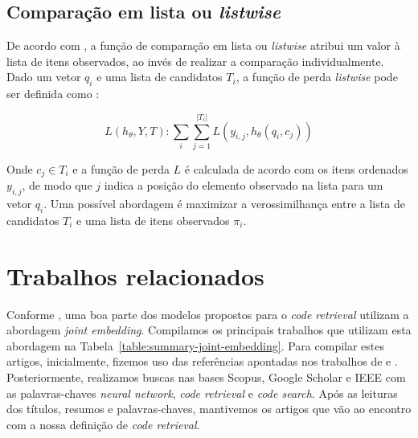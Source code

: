 \subsection{Comparação em lista ou \textit{listwise}}

De acordo com \cite{wu-sql-rank-listwise-approach:2018}, a função de comparação em lista ou \textit{listwise} atribui um valor à lista de itens observados, ao invés de realizar a comparação individualmente. Dado um vetor $q_{i}$ e uma lista de candidatos $T_{i}$, a função de perda \textit{listwise} pode ser definida como \citep{guo-deep-look-into-neural-ranking-models:2019}:

\begin{equation}
    L (h_{\theta}, Y, T): \sum_{i} \sum_{j = 1}^{|T_{i}|} L( y_{i,j}, h_{\theta}(q_{i}, c_{j}))
\end{equation}

Onde $c_{j} \in T_{i}$ e a função de perda $L$ é calculada de acordo com os itens ordenados $y_{i,j}$, de modo que $j$ indica a posição do elemento observado na lista para um vetor $q_{i}$. Uma possível abordagem é maximizar a verossimilhança entre a lista de candidatos $T_{i}$ e uma lista de itens observados $\pi_{i}$.



    

\section{Trabalhos relacionados}\label{sec:code-retrieval-trabalhos-relacionados}

Conforme \cite{cambronero-deep-learning-code-search:2019}, uma boa parte dos modelos propostos para o \textit{code retrieval} utilizam a abordagem \textit{joint embedding}. Compilamos os principais trabalhos que utilizam esta abordagem na Tabela~\ref{table:summary-joint-embedding}. Para compilar estes artigos, inicialmente, fizemos uso das referências apontadas nos  trabalhos de \citeauthor{Allamanis:2018:SML} e \citeauthor{yao-2018}. Posteriormente, realizamos buscas nas bases Scopus, Google Scholar e IEEE com as palavras-chaves \textit{neural network}, \textit{code retrieval} e \textit{code search}. Após as leituras dos títulos, resumos e palavras-chaves, mantivemos os artigos que vão ao encontro com a nossa definição de \textit{code retrieval}.

